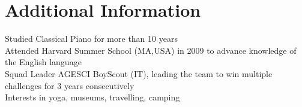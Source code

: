 \documentclass[letterpaper,11pt]{article}
\begin{document}
\section{Additional Information}
\begin{itemize}[leftmargin=0.15in, label={}]
   \small{\item{
    {Studied Classical Piano for more than 10 years} \\
    {Attended Harvard Summer School (MA,USA) in 2009 to advance knowledge of the English language} \\
    {Squad Leader AGESCI BoyScout (IT), leading the team to win multiple challenges for 3 years consecutively} \\
    {Interests in yoga, museums, travelling, camping}
   }} 
\end{itemize}
\end{document}

